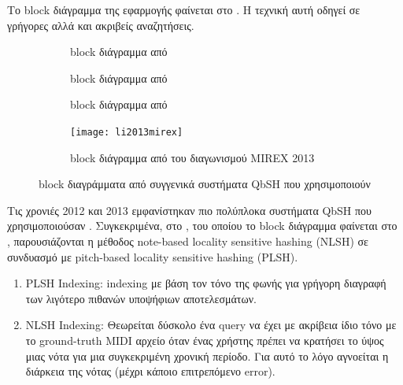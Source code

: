 Το block διάγραμμα της εφαρμογής φαίνεται στο .
Η τεχνική αυτή οδηγεί σε γρήγορες αλλά και ακριβείς αναζητήσεις.

\begin{figure}[htb]
    \centering
    \begin{subfigure}[t]{0.3\linewidth}
        \caption{block διάγραμμα από \protect\cite{wang2012query}}
        \label{fig:wang2012query}
    \end{subfigure}\hfill
    \begin{subfigure}[t]{0.3\linewidth}
        \caption{block διάγραμμα από \protect\cite{guo2012query}}
        \label{fig:guo2012query}
    \end{subfigure}\hfill
    \begin{subfigure}[t]{0.3\linewidth}
        \caption{block διάγραμμα από \protect\cite{guo2013query}}
        \label{fig:guo2013query}
    \end{subfigure}
    \begin{subfigure}[t]{0.63\linewidth}
        \texttt{[image: li2013mirex]}
        \caption{block διάγραμμα από \protect\cite{li2013mirex} του διαγωνισμού MIREX 2013}
        \label{fig:li2013mirex}
    \end{subfigure}
    \caption{block διαγράμματα από συγγενικά συστήματα QbSH που χρησιμοποιούν \lsh{}}
    \label{fig:many-lsb-blocks}
\end{figure}

Τις χρονιές 2012 και 2013 εμφανίστηκαν πιο πολύπλοκα συστήματα QbSH που χρησιμοποιούσαν \lsh{}.
Συγκεκριμένα, στο \cite{wang2012query}, του οποίου το block διάγραμμα φαίνεται στο ,
παρουσιάζονται η μέθοδος note-based locality sensitive hashing (NLSH)
σε συνδυασμό με pitch-based locality sensitive hashing (PLSH).
\begin{enumerate}
    \item PLSH Indexing:
    indexing με βάση τον τόνο της φωνής για γρήγορη διαγραφή των λιγότερο πιθανών υποψήφιων αποτελεσμάτων.
    \item NLSH Indexing:
    Θεωρείται δύσκολο ένα query να έχει με ακρίβεια ίδιο τόνο με το ground-truth MIDI αρχείο όταν ένας χρήστης πρέπει να κρατήσει το ύψος μιας νότα για μια συγκεκριμένη χρονική περίοδο.
    Για αυτό το λόγο αγνοείται η διάρκεια της νότας (μέχρι κάποιο επιτρεπόμενο error).
\end{enumerate}

